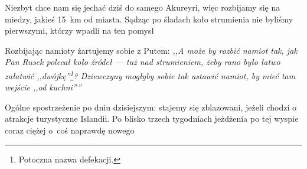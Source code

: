 Niezbyt chce nam się jechać dziś do samego Akureyri, więc rozbijamy się na miedzy, jakieś 15~km od miasta. Sądząc po śladach koło strumienia nie byliśmy pierwszymi, którzy wpadli na ten pomysł \grin

Rozbijając namioty żartujemy sobie z Putem: \emph{,,A może by rozbić namiot tak, jak Pan Rusek polecał koło źródeł --- tuż nad strumieniem, żeby rano było łatwo załatwić ,,dwójkę''\footnote{Potoczna nazwa defekacji.}? Dziewczyny mogłyby sobie tak ustawić namiot, by mieć tam wejście ,,od kuchni''\textellipsis''}


Ogólne spostrzeżenie po dniu dzisiejszym: stajemy się zblazowani, jeżeli chodzi o atrakcje turystyczne Islandii. Po blisko trzech tygodniach jeżdżenia po tej wyspie coraz ciężej o~coś naprawdę nowego\textellipsis
